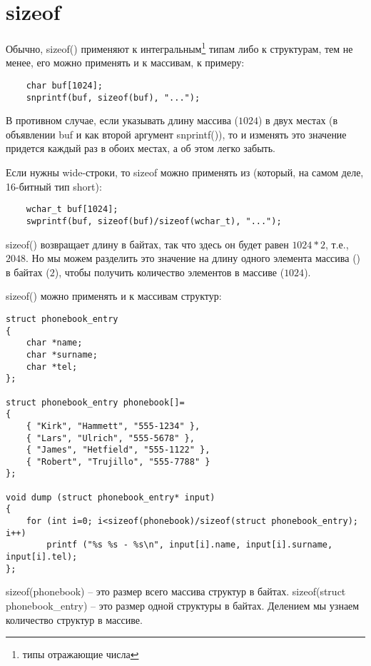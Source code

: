 ﻿\section{sizeof}

Обычно, sizeof() применяют к интегральным\footnote{типы отражающие числа} типам либо к структурам, 
тем не менее, его можно применять и к массивам, к примеру:


\begin{lstlisting}
	char buf[1024];
	snprintf(buf, sizeof(buf), "...");
\end{lstlisting}

В противном случае, если указывать длину массива ($1024$) в двух местах (в объявлении buf и как второй 
аргумент snprintf()), то и изменять это значение придется каждый раз в обоих местах, а об этом легко забыть.

Если нужны wide-строки, то sizeof можно применять из  (который, на самом деле, 16-битный тип short):

\begin{lstlisting}
	wchar_t buf[1024];
	swprintf(buf, sizeof(buf)/sizeof(wchar_t), "...");
\end{lstlisting}

sizeof() возвращает длину в байтах, так что здесь он будет равен $1024*2$, т.е., $2048$. Но мы можем
разделить это значение на длину одного элемента массива () в байтах ($2$), 
чтобы получить количество элементов в массиве ($1024$).

sizeof() можно применять и к массивам структур:

\begin{lstlisting}
struct phonebook_entry
{
	char *name;
	char *surname;
	char *tel;
};

struct phonebook_entry phonebook[]=
{
	{ "Kirk", "Hammett", "555-1234" },
	{ "Lars", "Ulrich", "555-5678" },
	{ "James", "Hetfield", "555-1122" },
	{ "Robert", "Trujillo", "555-7788" }
};

void dump (struct phonebook_entry* input)
{
	for (int i=0; i<sizeof(phonebook)/sizeof(struct phonebook_entry); i++)
		printf ("%s %s - %s\n", input[i].name, input[i].surname, input[i].tel);
};
\end{lstlisting}

sizeof(phonebook) -- это размер всего массива структур в байтах. sizeof(struct phonebook\_entry) -- 
это размер одной структуры в байтах.
Делением мы узнаем количество структур в массиве.

